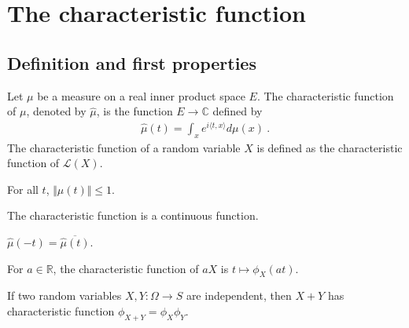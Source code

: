 \chapter{The characteristic function}

\section{Definition and first properties}

\begin{definition}\label{def:charFun}
 \leanok
Let $\mu$ be a measure on a real inner product space $E$. The characteristic function of $\mu$, denoted by $\hat{\mu}$, is the function $E \to \mathbb{C}$ defined by
\begin{align*}
\hat{\mu}(t) = \int_x e^{i \langle t, x \rangle} d\mu(x) \: .
\end{align*}
The characteristic function of a random variable $X$ is defined as the characteristic function of $\mathcal L(X)$.
\end{definition}

\begin{lemma}\label{lem:charFun_bounded}
 \leanok
{}
For all $t$, $\Vert\hat{\mu}(t)\Vert \le 1$.
\end{lemma}

\begin{lemma}\label{lem:charFun_continuous}
The characteristic function is a continuous function.
\end{lemma}

\begin{lemma}\label{lem:charFun_neg}
 \leanok
{}
$\hat{\mu}(-t) = \overline{\hat{\mu}(t)}$.
\end{lemma}

\begin{lemma}\label{lem:charFun_smul}
For $a \in \mathbb{R}$, the characteristic function of $a X$ is $t \mapsto \phi_X(at)$.
\end{lemma}

\begin{lemma}\label{lem:charFun_add_of_indep}
If two random variables $X, Y : \Omega \to S$ are independent, then $X+Y$ has characteristic function $\phi_{X+Y} = \phi_X \phi_Y$. 
\end{lemma}


